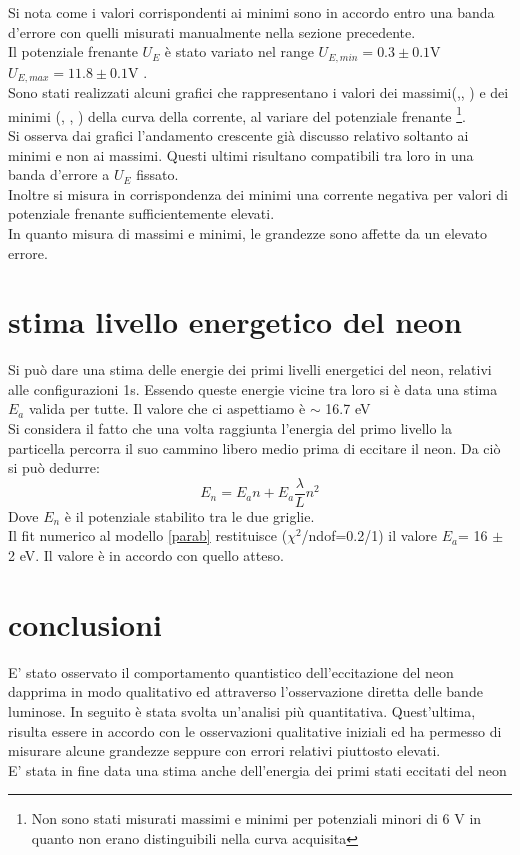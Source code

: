 Si nota come i valori corrispondenti ai minimi sono in accordo entro una banda d'errore con quelli misurati manualmente nella sezione precedente.\\
Il potenziale frenante $U_{E}$ è stato variato nel range $U_{E,min}=0.3\pm 0.1$V  $U_{E,max}=11.8 \pm 0.1$V . \\ 
Sono stati realizzati alcuni grafici che rappresentano i valori dei massimi(,, ) e dei minimi (, , ) della curva della corrente, al variare del potenziale frenante \footnote{Non sono stati misurati massimi e minimi per potenziali minori di 6 V in quanto non erano distinguibili nella curva acquisita}.\\
Si osserva dai grafici l'andamento crescente già discusso relativo soltanto ai minimi e non ai massimi. Questi ultimi risultano compatibili tra loro in una banda d'errore a $U_E$ fissato.\\
Inoltre si misura in corrispondenza dei minimi una corrente negativa per valori di potenziale frenante sufficientemente elevati. \\
In quanto misura di massimi e minimi, le grandezze sono affette da un elevato errore.
\section{stima livello energetico del neon}
Si può dare una stima delle energie dei primi livelli energetici del neon, relativi alle configurazioni 1s. Essendo queste energie vicine tra loro si è data una stima {$E_a$} valida per tutte. Il valore che ci aspettiamo è $\sim$ 16.7 eV\\
Si considera il fatto che una volta raggiunta l'energia del primo livello la particella percorra il suo cammino libero medio prima di eccitare il neon. Da ciò si può dedurre:
\begin{equation}
E_n= E_{a}n + E_{a}\frac{\lambda}{L}n^{2}
\label{parab}
\end{equation}
Dove {$E_n$} è il potenziale stabilito tra le due griglie.\\
Il fit numerico al modello \ref{parab} restituisce ($\chi^2$/ndof=0.2/1) il valore $E_a$= 16 $\pm$ 2 eV. Il valore è in accordo con quello atteso.

\section{conclusioni}
E' stato osservato il comportamento quantistico dell'eccitazione del neon dapprima in modo qualitativo ed attraverso l'osservazione diretta delle bande luminose. In seguito è stata svolta un'analisi più quantitativa. Quest'ultima, risulta essere in accordo con le osservazioni qualitative iniziali ed ha permesso di misurare alcune grandezze seppure con errori relativi piuttosto elevati.\\
E' stata in fine data una stima anche dell'energia dei primi stati eccitati del neon